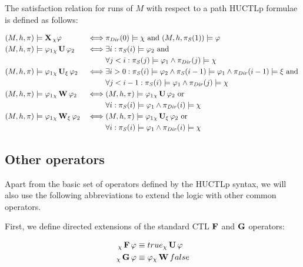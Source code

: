 The satisfaction relation for runs of $M$ with respect to a path \ac{HUCTLp} formulae is defined as follows:

\begin{alignat*}{2}
	(M,h,\pi) &\models \operatorname{\mathbf{X}}{}_{\chi} \varphi								& \iff & \pi_{\mathit{Dir}}(0) \models \chi \text{ and } (M, h, \pi_{\mathit{S}}(1)) \models \varphi \\
	(M,h,\pi) &\models \varphi_1 {}_{\chi}\operatorname{\mathbf{U}} \varphi_2		  & \iff & \exists i : \pi_{\mathit{S}}(i) \models \varphi_2 \text{ and } \\
				  &																		 & 		 & \forall j < i : \pi_{\mathit{S}}(j) \models \varphi_1 \land \pi_{\mathit{Dir}}(j) \models \chi \\
	(M,h,\pi) &\models \varphi_1 {}_{\chi}\operatorname{\mathbf{U}}_{\xi} \varphi_2 	 & \iff & \exists i > 0 : \pi_{\mathit{S}}(i) \models \varphi_2 \land \pi_{\mathit{S}}(i-1) \models \varphi_1 \land \pi_{\mathit{Dir}}(i-1) \models \xi  \text{ and } \\
				  & 																	  & 	 & \forall j < i - 1 : \pi_{\mathit{S}}(i) \models \varphi_1 \land \pi_{\mathit{Dir}}(j) \models \chi \\
	(M,h,\pi) &\models \varphi_1 {}_{\chi}\operatorname{\mathbf{W}} \varphi_2		  & \iff & (M,h,\pi) \models \varphi_1 {}_{\chi}\operatorname{\mathbf{U}} \varphi_2 \text{ or } \\
				  &																		 & 		 & \forall i : \pi_{\mathit{S}}(i) \models \varphi_1 \land \pi_{\mathit{Dir}}(i) \models \chi \\
	(M,h,\pi) &\models \varphi_1 {}_{\chi}\operatorname{\mathbf{W}}_{\xi} \varphi_2		  & \iff & (M,h,\pi) \models \varphi_1 {}_{\chi}\operatorname{\mathbf{U}}_{\xi} \varphi_2 \text{ or } \\
&																		 & 		 & \forall i : \pi_{\mathit{S}}(i) \models \varphi_1 \land \pi_{\mathit{Dir}}(i) \models \chi \\
\end{alignat*}

\subsection{Other operators}

Apart from the basic set of operators defined by the \ac{HUCTLp} syntax, we will also use the following abbreviations to extend the logic with other common operators.

First, we define directed extensions of the standard \ac{CTL} $\operatorname{\mathbf{F}}$ and $\operatorname{\mathbf{G}}$ operators:

\begin{align*}
	{}_{\chi}\operatorname{\mathbf{F}} \varphi 				 & \equiv true {}_{\chi}\operatorname{\mathbf{U}} \varphi \\
	{}_{\chi}\operatorname{\mathbf{G}} \varphi 				& \equiv \varphi {}_{\chi}\operatorname{\mathbf{W}} false \\
\end{align*}

